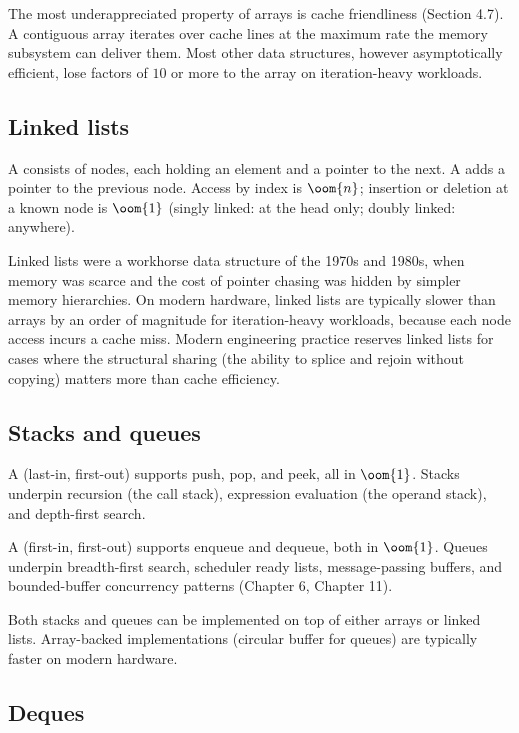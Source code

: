 The most underappreciated property of arrays is cache friendliness (Section 4.7). A contiguous array iterates over cache lines at the maximum rate the memory subsystem can deliver them. Most other data structures, however asymptotically efficient, lose factors of $10$ or more to the array on iteration-heavy workloads.

\subsection{Linked lists}

A  consists of nodes, each holding an element and a pointer to the next. A  adds a pointer to the previous node. Access by index is $\oom{n}$; insertion or deletion at a known node is $\oom{1}$ (singly linked: at the head only; doubly linked: anywhere).

Linked lists were a workhorse data structure of the 1970s and 1980s, when memory was scarce and the cost of pointer chasing was hidden by simpler memory hierarchies. On modern hardware, linked lists are typically slower than arrays by an order of magnitude for iteration-heavy workloads, because each node access incurs a cache miss. Modern engineering practice reserves linked lists for cases where the structural sharing (the ability to splice and rejoin without copying) matters more than cache efficiency.

\subsection{Stacks and queues}

A  (last-in, first-out) supports push, pop, and peek, all in $\oom{1}$. Stacks underpin recursion (the call stack), expression evaluation (the operand stack), and depth-first search.

A  (first-in, first-out) supports enqueue and dequeue, both in $\oom{1}$. Queues underpin breadth-first search, scheduler ready lists, message-passing buffers, and bounded-buffer concurrency patterns (Chapter 6, Chapter 11).

Both stacks and queues can be implemented on top of either arrays or linked lists. Array-backed implementations (circular buffer for queues) are typically faster on modern hardware.

\subsection{Deques}

